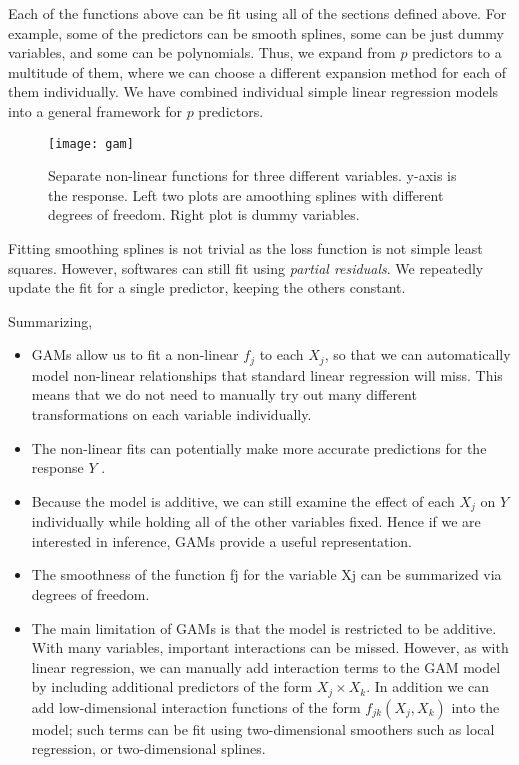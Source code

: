 \documentclass[../statistical_learning_notes.tex]{subfiles}
\begin{document}
    Each of the functions above can be fit using all of the sections defined above. For example, some of the predictors can be smooth splines, some can be just dummy variables, and some can be polynomials. Thus, we expand from $p$ predictors to a multitude of them, where we can choose a different expansion method for each of them individually. We have combined individual simple linear regression models into a general framework for $p$ predictors.

    \begin{figure}[h]
    \texttt{[image: gam]}
    \centering
    \caption{Separate non-linear functions for three different variables. y-axis is the response. Left two plots are amoothing splines with different degrees of freedom. Right plot is dummy variables.}
    \label{fig:gam} %
    \end{figure}

    Fitting smoothing splines is not trivial as the loss function is not simple least squares. However, softwares can still fit using \emph{partial residuals}. We repeatedly update the fit for a single predictor, keeping the others constant.

    Summarizing,
    \begin{itemize}
        \item GAMs allow us to fit a non-linear $f_{j}$ to each $X_{j}$, so that we can automatically model non-linear relationships that standard linear regression will miss. This means that we do not need to manually try out many different transformations on each variable individually.
        \item The non-linear fits can potentially make more accurate predictions for the response $Y$ .
        \item Because the model is additive, we can still examine the effect of each $X_{j}$ on $Y$ individually while holding all of the other variables fixed. Hence if we are interested in inference, GAMs provide a useful representation.
        \item The smoothness of the function fj for the variable Xj can be summarized via degrees of freedom.
        \item The main limitation of GAMs is that the model is restricted to be additive. With many variables, important interactions can be missed. However, as with linear regression, we can manually add interaction terms to the GAM model by including additional predictors of the form $X_{j} \times X_{k}$. In addition we can add low-dimensional interaction functions of the form $f_{jk}(X_{j}, X_{k})$ into the model; such terms can be fit using two-dimensional smoothers such as local regression, or two-dimensional splines.
    \end{itemize}
\end{document}
